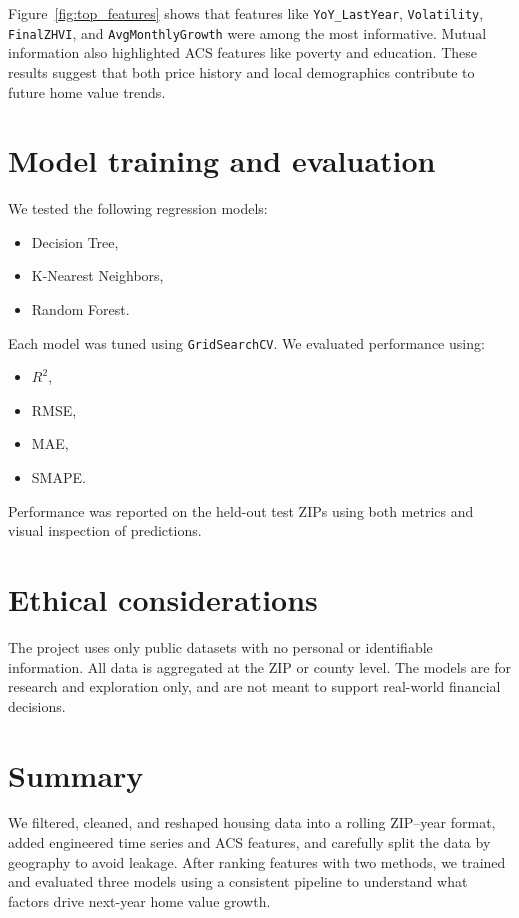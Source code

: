 Figure~\ref{fig:top_features} shows that features like \texttt{YoY\_LastYear}, \texttt{Volatility}, \texttt{FinalZHVI}, and \texttt{AvgMonthlyGrowth} were among the most informative. Mutual information also highlighted ACS features like poverty and education. These results suggest that both price history and local demographics contribute to future home value trends.

\section{Model training and evaluation}
We tested the following regression models:
\begin{itemize}
    \item Decision Tree,
    \item K-Nearest Neighbors,
    \item Random Forest.
\end{itemize}

Each model was tuned using \texttt{GridSearchCV}. We evaluated performance using:
\begin{itemize}
    \item $R^2$,
    \item RMSE,
    \item MAE,
    \item SMAPE.
\end{itemize}

Performance was reported on the held-out test ZIPs using both metrics and visual inspection of predictions.

\section{Ethical considerations}
The project uses only public datasets with no personal or identifiable information. All data is aggregated at the ZIP or county level. The models are for research and exploration only, and are not meant to support real-world financial decisions.

\section{Summary}
We filtered, cleaned, and reshaped housing data into a rolling ZIP–year format, added engineered time series and ACS features, and carefully split the data by geography to avoid leakage. After ranking features with two methods, we trained and evaluated three models using a consistent pipeline to understand what factors drive next-year home value growth.
